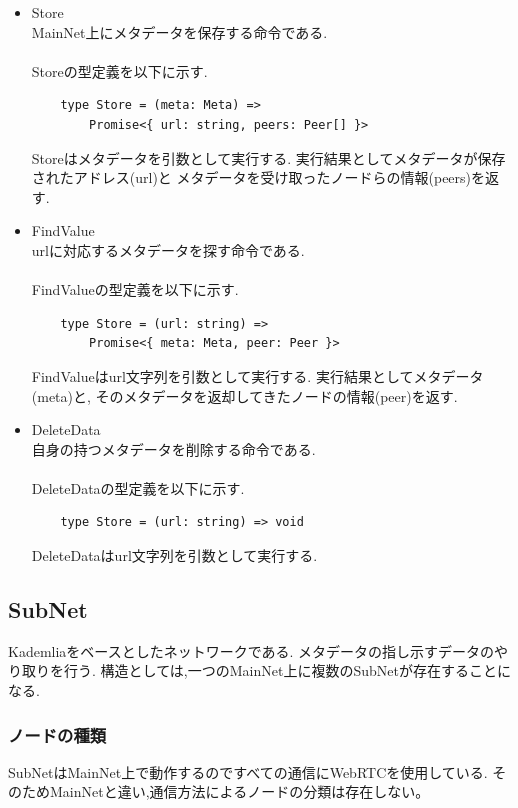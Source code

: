 \documentclass[sotsuron]{jcsie}
\begin{document}
\begin{itemize}
	\item {Store}\\
	      MainNet上にメタデータを保存する命令である.
	      \\\\
	      Storeの型定義を以下に示す.
	      \begin{lstlisting}
	type Store = (meta: Meta) => 
		Promise<{ url: string, peers: Peer[] }>
	      \end{lstlisting}
	      	      
	      Storeはメタデータを引数として実行する.
	      実行結果としてメタデータが保存されたアドレス(url)と
	      メタデータを受け取ったノードらの情報(peers)を返す.
	      \\
	\item {FindValue}\\
	      urlに対応するメタデータを探す命令である.
	      \\\\
	      FindValueの型定義を以下に示す.
	      \begin{lstlisting}
	type Store = (url: string) => 
		Promise<{ meta: Meta, peer: Peer }>
	      \end{lstlisting}
	      	      
	      FindValueはurl文字列を引数として実行する.
	      実行結果としてメタデータ(meta)と,
	      そのメタデータを返却してきたノードの情報(peer)を返す.
	      \\
	\item {DeleteData}\\
	      自身の持つメタデータを削除する命令である.
	      \\\\
	      DeleteDataの型定義を以下に示す.
	      \begin{lstlisting}
	type Store = (url: string) => void
	      \end{lstlisting}
	      	      
	      DeleteDataはurl文字列を引数として実行する.
\end{itemize}

\subsection{SubNet}
Kademliaをベースとしたネットワークである.
メタデータの指し示すデータのやり取りを行う.
構造としては,一つのMainNet上に複数のSubNetが存在することになる.

\subsubsection{ノードの種類}
SubNetはMainNet上で動作するのですべての通信にWebRTCを使用している.
そのためMainNetと違い,通信方法によるノードの分類は存在しない。
\end{document}
